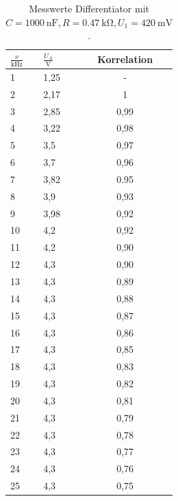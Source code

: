 \documentclass{scrartcl}
\begin{document}
\begin{table}
\centering
\begin{tabular}{p{2cm}|p{2cm}|c}

$\frac{\nu}{\si{\kilo \hertz}}$ & $\frac{U_A}{\si{\volt}}$ & Korrelation \\

\toprule
1	& 1,25 & -\\
2	& 2,17 & 1\\
3	& 2,85 & 0,99\\
    4	& 3,22  & 0,98\\
    5	&  3,5 & 0,97\\
    6	& 3,7 & 0,96\\
    7	& 3,82 & 0.95\\
    8	& 3,9 & 0,93\\
9	& 3,98 & 0,92\\
10	& 4,2 & 0,92\\
    11	& 4,2 & 0,90\\
    12	& 4,3 & 0,90\\
    13	& 4,3 & 0,89\\
    14	& 4,3 & 0,88\\
    15	& 4,3 & 0,87\\
    16	& 4,3 & 0,86\\
    17	& 4,3 & 0,85\\
    18	& 4,3 & 0,83\\
    19	& 4,3 & 0,82\\
    20	& 4,3 & 0,81\\
    21	& 4,3 & 0,79\\
    22	& 4,3 & 0,78\\
    23	& 4,3 & 0,77\\
    24	& 4,3 & 0,76\\
    25	& 4,3 & 0,75\\

\bottomrule
\end{tabular}
\caption{Messwerte Differentiator mit $C=\SI{1000}{\nano \farad},R=\SI{0,47}{\kilo \ohm},U_1=\SI{420}{\milli \volt}$.}
\label{tab:diff}
\end{table}
\end{document}
